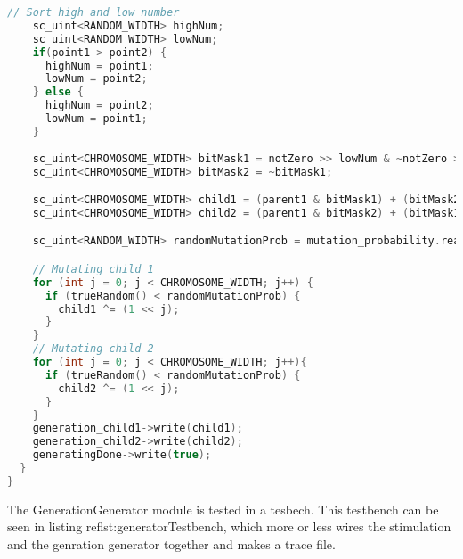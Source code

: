 \begin{lstlisting}[language=C++,caption={GenerationGenerator.cpp},label={lst:generationgenerator_cpp}]
    // Sort high and low number
    sc_uint<RANDOM_WIDTH> highNum;
    sc_uint<RANDOM_WIDTH> lowNum;
    if(point1 > point2) {
      highNum = point1;
      lowNum = point2;
    } else {
      highNum = point2;
      lowNum = point1;
    }
  
    sc_uint<CHROMOSOME_WIDTH> bitMask1 = notZero >> lowNum & ~notZero >> highNum;
    sc_uint<CHROMOSOME_WIDTH> bitMask2 = ~bitMask1;

    sc_uint<CHROMOSOME_WIDTH> child1 = (parent1 & bitMask1) + (bitMask2 & parent2);
    sc_uint<CHROMOSOME_WIDTH> child2 = (parent1 & bitMask2) + (bitMask1 & parent2);

    sc_uint<RANDOM_WIDTH> randomMutationProb = mutation_probability.read();

    // Mutating child 1
    for (int j = 0; j < CHROMOSOME_WIDTH; j++) {
      if (trueRandom() < randomMutationProb) {
        child1 ^= (1 << j);
      }
    }
    // Mutating child 2
    for (int j = 0; j < CHROMOSOME_WIDTH; j++){
      if (trueRandom() < randomMutationProb) {
        child2 ^= (1 << j);
      }
    }
    generation_child1->write(child1);
    generation_child2->write(child2);
    generatingDone->write(true);
  }
}
\end{lstlisting}

The GenerationGenerator module is tested in a tesbech. This testbench can be seen in listing ref{lst:generatorTestbench}, which more or less wires the stimulation and the genration generator together and makes a trace file.

